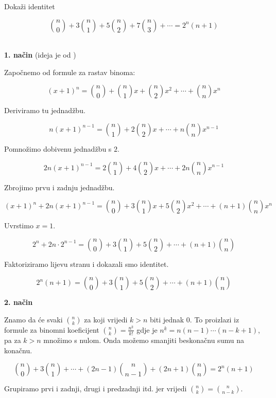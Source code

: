 \documentclass[exam.tex]{subfiles}
\begin{document}
	\begin{task}
		Dokaži identitet
	
		\[ \binom{n}{0} + 3 \binom{n}{1} + 5 \binom{n}{2} + 7 \binom{n}{3} + \cdots = 2^n (n + 1) \] \\[1em]
	\end{task}

	\textbf{1. način} (ideja je od \UkiseljeniKrastavac)
	
	Započnemo od formule za rastav binoma:
	
	\[ (x + 1)^n = \binom{n}{0} + \binom{n}{1} x + \binom{n}{2} x^2 + \cdots + \binom{n}{n} x^n \]
	
	Deriviramo tu jednadžbu.
	
	\[ n (x + 1)^{n - 1} = \binom{n}{1} + 2 \binom{n}{2} x + \cdots + n \binom{n}{n} x^{n - 1} \]
	
	Pomnožimo dobivenu jednadžbu s \( 2 \).
	
	\[ 2 n (x + 1)^{n - 1} = 2 \binom{n}{1} + 4 \binom{n}{2} x + \cdots + 2 n \binom{n}{n} x^{n - 1} \]
	
	Zbrojimo prvu i zadnju jednadžbu.
	
	\[ (x + 1)^n + 2 n (x + 1)^{n - 1} = \binom{n}{0} + 3 \binom{n}{1} x + 5 \binom{n}{2} x^2 + \cdots + (n + 1) \binom{n}{n} x^n \]
	
	Uvrstimo \( x = 1 \).
	
	\[ 2^n + 2 n \cdot 2^{n - 1} = \binom{n}{0} + 3 \binom{n}{1} + 5 \binom{n}{2} + \cdots + (n + 1) \binom{n}{n} \]
	
	Faktoriziramo lijevu stranu i dokazali smo identitet.
	
	\[ 2^n (n + 1) = \binom{n}{0} + 3 \binom{n}{1} + 5 \binom{n}{2} + \cdots + (n + 1) \binom{n}{n} \] 
	
	\textbf{2. način}
	
	Znamo da će svaki \( \displaystyle \binom{n}{k} \) za koji vrijedi \( k > n \) biti jednak 0. To proizlazi iz formule za binomni koeficijent \( \displaystyle \binom{n}{k} = \frac{n^{\underline{k}}}{k!} \) gdje je \( n^{\underline{k}} = n (n - 1) \cdots (n - k + 1) \), pa za \( k > n\) množimo s nulom. Onda možemo smanjiti beskonačnu sumu na konačnu.
	
	\[ \binom{n}{0} + 3 \binom{n}{1} + \cdots + (2n - 1) \binom{n}{n - 1} + (2n + 1) \binom{n}{n} = 2^n (n + 1) \]
	
	Grupiramo prvi i zadnji, drugi i predzadnji itd. jer vrijedi \( \binom{n}{k} = \binom{n}{n - k} \). \\
	
\end{document}
